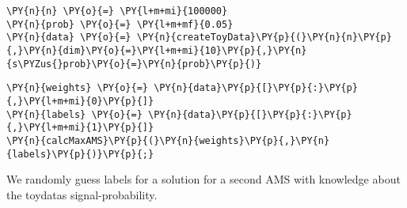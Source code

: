 
{\par%
\vspace{-1\baselineskip}%
}%
\begin{notebookcell}[]%
\begin{addmargin}[\cellleftmargin]{0em}%
{\smaller%
\par%
%
\vspace{-1\smallerfontscale}%
\begin{Verbatim}[commandchars=\\\{\}]
\PY{n}{n} \PY{o}{=} \PY{l+m+mi}{100000}
\PY{n}{prob} \PY{o}{=} \PY{l+m+mf}{0.05}
\PY{n}{data} \PY{o}{=} \PY{n}{createToyData}\PY{p}{(}\PY{n}{n}\PY{p}{,}\PY{n}{dim}\PY{o}{=}\PY{l+m+mi}{10}\PY{p}{,}\PY{n}{s\PYZus{}prob}\PY{o}{=}\PY{n}{prob}\PY{p}{)}
\end{Verbatim}
%
\par%
\vspace{-1\smallerfontscale}}%
\end{addmargin}
\end{notebookcell}



{\par%
\vspace{-1\baselineskip}%
}%
\begin{notebookcell}[]%
\begin{addmargin}[\cellleftmargin]{0em}%
{\smaller%
\par%
%
\vspace{-1\smallerfontscale}%
\begin{Verbatim}[commandchars=\\\{\}]
\PY{n}{weights} \PY{o}{=} \PY{n}{data}\PY{p}{[}\PY{p}{:}\PY{p}{,}\PY{l+m+mi}{0}\PY{p}{]}
\PY{n}{labels} \PY{o}{=} \PY{n}{data}\PY{p}{[}\PY{p}{:}\PY{p}{,}\PY{l+m+mi}{1}\PY{p}{]}
\PY{n}{calcMaxAMS}\PY{p}{(}\PY{n}{weights}\PY{p}{,}\PY{n}{labels}\PY{p}{)}\PY{p}{;}
\end{Verbatim}
%
\par%
\vspace{-1\smallerfontscale}}%
\end{addmargin}
\end{notebookcell}


    We randomly guess labels for a solution for a second AMS with knowledge
about the toydatas signal-probability.


